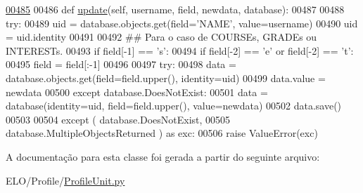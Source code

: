 \begin{DoxyCode}
\hypertarget{classProfile_1_1ProfileUnit_1_1PersProfile_l00485}{}\hyperlink{classProfile_1_1ProfileUnit_1_1PersProfile_af1e4b3cf0eee0a14b5113210503ff665}{00485} 
00486     \textcolor{keyword}{def }\hyperlink{classProfile_1_1ProfileUnit_1_1PersProfile_af1e4b3cf0eee0a14b5113210503ff665}{update}(self, username, field, newdata, database):
00487         
00488         \textcolor{keywordflow}{try}:
00489             uid = database.objects.get(field=\textcolor{stringliteral}{'NAME'}, value=username)
00490             uid = uid.identity
00491 
00492             \textcolor{comment}{## Para o caso de COURSEs, GRADEs ou INTERESTs.}
00493             \textcolor{keywordflow}{if} field[-1] == \textcolor{stringliteral}{'s'}:
00494                 \textcolor{keywordflow}{if} field[-2] == \textcolor{stringliteral}{'e'} \textcolor{keywordflow}{or} field[-2] == \textcolor{stringliteral}{'t'}:
00495                     field = field[:-1]
00496                 
00497             \textcolor{keywordflow}{try}:
00498                 data = database.objects.get(field=field.upper(), identity=uid)
00499                 data.value = newdata
00500             \textcolor{keywordflow}{except} database.DoesNotExist:
00501                 data = database(identity=uid, field=field.upper(), value=newdata)
00502             data.save()
00503 
00504         \textcolor{keywordflow}{except} ( database.DoesNotExist, 
00505                  database.MultipleObjectsReturned ) \textcolor{keyword}{as} exc:
00506             \textcolor{keywordflow}{raise} ValueError(exc)
\end{DoxyCode}


A documentação para esta classe foi gerada a partir do seguinte arquivo\-:\begin{DoxyCompactItemize}
\item 
E\-L\-O/\-Profile/\hyperlink{ProfileUnit_8py}{Profile\-Unit.\-py}\end{DoxyCompactItemize}
